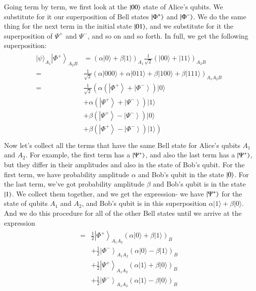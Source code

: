 Going term by term, we first look at the $\left| 00 \right\rangle$ state of Alice's qubits.
We substitute for it our superposition of Bell states  $\left| \Phi^+ \right\rangle$ and $\left| \Phi^- \right\rangle$. We do the same thing for the next term in the initial state $\left| 01 \right\rangle$, and we substitute for it the superposition of $\Psi^+$ and $\Psi^-$, and so on and so forth. In full, we get the following superposition:
\begin{align}
    \begin{aligned}
|\psi\rangle_{A_{1}}\left|\Phi^{+}\right\rangle_{A_{2} B} &=(\alpha|0\rangle+\beta|1\rangle)_{A_{1}} \frac{1}{\sqrt{2}}(|00\rangle+|11\rangle)_{A_{2} B} \\
=&\frac{1}{\sqrt{2}}(\alpha|000\rangle+\alpha|011\rangle+\beta|100\rangle+\beta|111\rangle)_{A_{1} A_{2} B} \\
=& \frac{1}{\sqrt{2}}\left(\alpha\left(\left|\Phi^{+}\right\rangle+\left|\Phi^{-}\right\rangle\right)|0\rangle\right.\\
&+\alpha\left(\left|\Psi^{+}\right\rangle+\left|\Psi^{-}\right\rangle\right)|1\rangle \\
&+\beta\left(\left|\Psi^{+}\right\rangle-\left|\Psi^{-}\right\rangle\right)|0\rangle \\
&\left.+\beta\left(\left|\Phi^{+}\right\rangle-\left|\Phi^{-}\right\rangle\right)|1\rangle\right) \\
\end{aligned}
\end{align}
Now let's collect all the terms that have the same Bell state for Alice's qubits $A_1$ and $A_2$.  For example, the first term has a $\left| \Psi^+ \right\rangle$, and also the last term has a $\left| \Psi^+ \right\rangle$, but they differ in their amplitudes and also in the state of Bob's qubit. For the first term, we have probability amplitude $\alpha$ and Bob's qubit in the state $\left| 0 \right\rangle$. For the last term, we've got probability amplitude $\beta$ and Bob's qubit is in the state $\left| 1 \right\rangle$. We collect them together, and we get the expression- we have $\left| \Psi^+ \right\rangle$ for the state of qubits $A_1$ and $A_2$, and Bob's qubit is in this superposition $\alpha|1\rangle+\beta|0\rangle$. And we do this procedure for all of the other Bell states until we arrive at the expression
\begin{align}
    \begin{aligned}
=&\frac{1}{2}\left|\Phi^{+}\right\rangle_{A_{1} A_{2}}(\alpha|0\rangle+\beta|1\rangle)_{B} \\
&+\frac{1}{2}\left|\Phi^{-}\right\rangle_{A_{1} A_{2}}(\alpha|0\rangle-\beta|1\rangle)_{B} \\
&+\frac{1}{2}\left|\Psi^{+}\right\rangle_{A_{1} A_{2}}(\alpha|1\rangle+\beta|0\rangle)_{B} \\
&+\frac{1}{2}\left|\Psi^{-}\right\rangle_{A_{1} A_{2}}(\alpha|1\rangle-\beta|0\rangle)_{B}
\end{aligned}
\label{eq:teleport-alice-basis}
\end{align}

